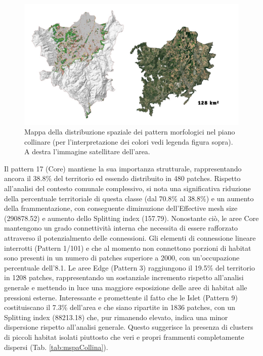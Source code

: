 \documentclass[
  a4paper,
]{book}
\begin{document}
\begin{figure}

{\centering \includegraphics[width=\linewidth]{./figs/mspa8211_collina} 

}

\caption{Mappa della distribuzione spaziale dei pattern morfologici nel piano collinare (per l'interpretazione dei colori vedi legenda figura sopra). A destra l'immagine satellitare dell'area.}\label{fig:mspaCollina}
\end{figure}

Il pattern 17 (Core) mantiene la sua importanza strutturale, rappresentando ancora il 38.8\% del territorio ed essendo distribuito in 480 patches.
Rispetto all'analisi del contesto comunale complessivo, si nota una significativa riduzione della percentuale territoriale di questa classe (dal 70.8\% al 38.8\%) e un aumento della frammentazione, con conseguente diminuzione dell'Effective mesh size (290878.52) e aumento dello Splitting index (157.79).
Nonostante ciò, le aree Core mantengono un grado connettività interna che necessita di essere rafforzato attraverso il potenzialmento delle connessioni.
Gli elementi di connessione lineare interrotti (Pattern 1/101) e che al momento non connettono porzioni di habitat sono presenti in un numero di patches superiore a 2000, con un'occupazione percentuale dell'8.1.
Le aree Edge (Pattern 3) raggiungono il 19.5\% del territorio in 1208 patches, rappresentando un sostanziale incremento rispetto all'analisi generale e mettendo in luce una maggiore esposizione delle aree di habitat alle pressioni esterne.
Interessante e promettente il fatto che le Islet (Pattern 9) costituiscano il 7.3\% dell'area e che siano ripartite in 1836 patches, con un Splitting index (88213.18) che, pur rimanendo elevato, indica una minor dispersione rispetto all'analisi generale.
Questo suggerisce la presenza di clusters di piccoli habitat isolati piuttosto che veri e propri frammenti completamente dispersi (Tab. \ref{tab:mspaCollina}).
\end{document}
